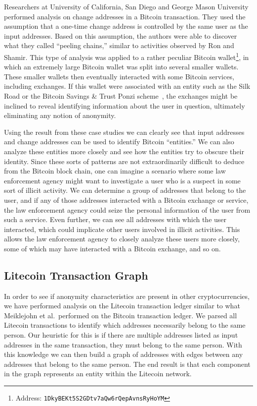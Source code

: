 \documentclass[11pt]{article}
\begin{document}
Researchers at University of California, San Diego and George Mason University~\cite{meiklejohn13} performed analysis on
change addresses in a Bitcoin transaction. They used the assumption that a one-time change address is controlled by the
same user as the input addresses. Based on this assumption, the authors were able to discover what they called ``peeling
chains,'' similar to activities observed by Ron and Shamir. This type of analysis was applied to a rather peculiar
Bitcoin wallet\footnote{Address: {\tt 1DkyBEKt5S2GDtv7aQw6rQepAvnsRyHoYM}}, in which an extremely large Bitcoin wallet
was split into several smaller wallets. These smaller wallets then eventually interacted with some Bitcoin services,
including exchanges. If this wallet were associated with an entity such as the Silk Road or the Bitcoin Savings \& Trust
Ponzi scheme~\cite{moore13}, the exchanges might be inclined to reveal identifying information about the user in
question, ultimately eliminating any notion of anonymity.

Using the result from these case studies we can clearly see that input addresses and change addresses can be used to
identify Bitcoin ``entities.'' We can also analyze these entities more closely and see how the entities try to obscure
their identity. Since these sorts of patterns are not extraordinarily difficult to deduce from the Bitcoin block chain,
one can imagine a scenario where some law enforcement agency might want to investigate a user who is a suspect in some
sort of illicit activity. We can determine a group of addresses that belong to the user, and if any of those addresses
interacted with a Bitcoin exchange or service, the law enforcement agency could seize the personal information of the
user from such a service. Even further, we can see all addresses with which the user interacted, which could implicate
other users involved in illicit activities. This allows the law enforcement agency to closely analyze these users more
closely, some of which may have interacted with a Bitcoin exchange, and so on.

\subsection{Litecoin Transaction Graph}
In order to see if anonymity characteristics are present in other cryptocurrencies, we have performed analysis on the
Litecoin transaction ledger similar to what Meiklejohn et al.\ performed on the Bitcoin transaction
ledger\cite{meiklejohn13}. We parsed all Litecoin transactions to identify which addresses necessarily belong to the
same person. Our heuristic for this is if there are multiple addresses listed as input addresses in the same
transaction, they must belong to the same person. With this knowledge we can then build a graph of addresses with edges
between any addresses that belong to the same person. The end result is that each component in the graph represents an
entity within the Litecoin network.
\end{document}

